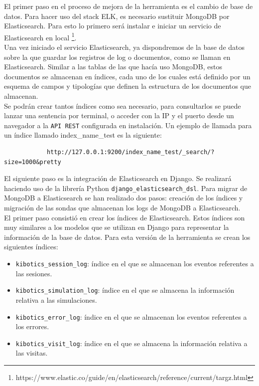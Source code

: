 \documentclass[a4paper, 12pt]{book}
\begin{document}
		El primer paso en el proceso de mejora de la herramienta es el cambio de base de datos. Para hacer uso del stack ELK, es necesario sustituir MongoDB por Elasticsearch. Para esto lo primero será instalar e iniciar un servicio de Elasticsearch en local \footnote{https://www.elastic.co/guide/en/elasticsearch/reference/current/targz.html}.\\
				
		Una vez iniciado el servicio Elasticsearch, ya dispondremos de la base de datos sobre la que guardar los registros de log o documentos, como se llaman en Elasticsearch. Similar a las tablas de las que hacía uso MongoDB, estos documentos se almacenan en índices, cada uno de los cuales está definido por un esquema de campos y tipologías que definen la estructura de los documentos que almacenan.\\
		
		Se podrán crear tantos índices como sea necesario, para consultarlos se puede lanzar una sentencia por terminal, o acceder con la IP y el puerto desde un navegador a la \texttt{API REST} configurada en instalación. Un ejemplo de llamada para un índice llamado index\_name\_test es la siguiente:
		
		{\footnotesize
		\begin{verbatim}
			http://127.0.0.1:9200/index_name_test/_search/?size=1000&pretty
		\end{verbatim}
		}
		
		El siguiente paso es la integración de Elasticsearch en Django. Se realizará haciendo uso de la librería Python \texttt{django\_elasticsearch\_dsl}. Para migrar de MongoDB a Elasticsearch se han realizado dos pasos: creación de los índices y migración de las sondas que almacenan los logs de MongoDB a Elasticsearch.\\
		
		
		El primer paso consistió en crear los índices de Elasticsearch. Estos índices son muy similares a los modelos que se utilizan en Django para representar la información de la base de datos. Para esta versión de la herramienta se crean los siguientes índices: 				
		
		\begin{itemize}
			\item \texttt{kibotics\_session\_log}: índice en el que se almacenan los eventos referentes a las sesiones.
			
			\item \texttt{kibotics\_simulation\_log}: índice en el que se almacena la información relativa a las simulaciones.
			
			\item \texttt{kibotics\_error\_log}: índice en el que se almacenan los eventos referentes a los errores.
			
			\item \texttt{kibotics\_visit\_log}: índice en el que se almacena la información relativa a las visitas.
		\end{itemize}				
		
\end{document}
